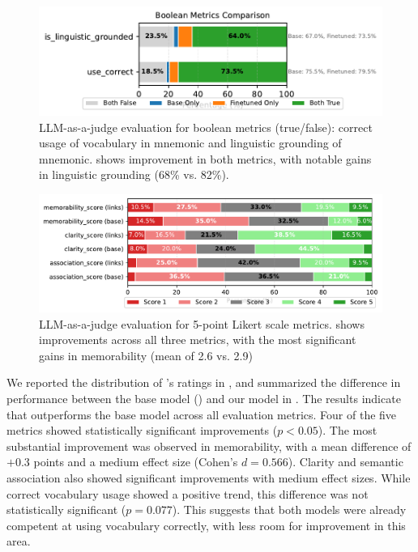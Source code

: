 \begin{figure}[htb]
  \centering
  \includegraphics[width=\linewidth]{figures/boolean_comparison.pdf}
  \caption{LLM-as-a-judge evaluation for boolean metrics (true/false): correct usage of vocabulary in mnemonic and linguistic grounding of mnemonic. \linksys shows improvement in both metrics, with notable gains in linguistic grounding (68\% vs. 82\%).}
  \label{fig:llm-judge-boolean}
\end{figure}

\begin{figure}[htb]
  \centering
  \includegraphics[width=\linewidth]{figures/likert_distribution.pdf}
  \caption{LLM-as-a-judge evaluation for 5-point Likert scale metrics. \linksys shows improvements across all three metrics, with the most significant gains in memorability (mean of 2.6 vs. 2.9)}
  \label{fig:llm-judge-likert}
\end{figure}

We reported the distribution of \judgemodel's ratings in , and summarized the difference in performance between the base model (\studentmodel) and our model in . The results indicate that \linksys outperforms the base model across all evaluation metrics. Four of the five metrics showed statistically significant improvements ($p < 0.05$). The most substantial improvement was observed in memorability, with a mean difference of $+0.3$ points and a medium effect size (Cohen's $d = 0.566$). Clarity and semantic association also showed significant improvements with medium effect sizes. While correct vocabulary usage showed a positive trend, this difference was not statistically significant ($p = 0.077$). This suggests that both models were already competent at using vocabulary correctly, with less room for improvement in this area.

